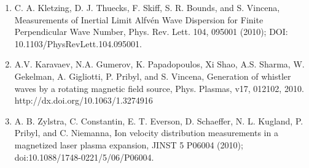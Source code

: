 \documentclass[11pt]{article}
\begin{document}
\begin{enumerate}
\item   C. A. Kletzing, D. J. Thuecks, F. Skiff, S. R. Bounds, and S. Vincena, Measurements of Inertial Limit Alfv\'{e}n Wave Dispersion for Finite Perpendicular Wave Number, Phys. Rev. Lett. 104, 095001 (2010); DOI: 10.1103/PhysRevLett.104.095001.

\item  A.V. Karavaev, N.A. Gumerov, K. Papadopoulos, Xi Shao, A.S. Sharma, W. Gekelman, A. Gigliotti, P. Pribyl, and S. Vincena, Generation of whistler waves by a rotating magnetic field source, Phys. Plasmas, v17, 012102, 2010. http://dx.doi.org/10.1063/1.3274916

\item  A. B. Zylstra, C. Constantin, E. T. Everson, D. Schaeffer, N. L. Kugland, P. Pribyl, and C. Niemanna, Ion velocity distribution measurements in a magnetized laser plasma expansion, JINST 5 P06004 (2010); doi:10.1088/1748-0221/5/06/P06004.

\end{enumerate}
	


%
%
%
%  
\end{document}
